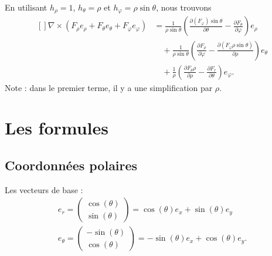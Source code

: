 En utilisant \( h_{\rho}=1\), \( h_{\theta}=\rho\) et \( h_{\varphi}=\rho\sin\theta\), nous trouvons
\begin{equation}
	\begin{aligned}[]
		\nabla\times(F_{\rho}e_{\rho}+F_{\theta}e_{\theta}+F_{\varphi}e_{\varphi}) & =\frac{1}{ \rho\sin\theta }\left( \frac{ \partial (F_{\varphi})\sin\theta }{ \partial \theta }-\frac{ \partial F_{\theta} }{ \partial \varphi } \right)e_{\rho}        \\
		                                                                           & \quad+\frac{1}{ \rho\sin\theta }\left( \frac{ \partial F_{\rho} }{ \partial \varphi }-\frac{ \partial (F_{\varphi}\rho\sin\theta) }{ \partial \rho } \right)e_{\theta} \\
		                                                                           & \quad+\frac{1}{ \rho }\left( \frac{ \partial F_{\theta}\rho }{ \partial \rho }-\frac{ \partial F_r }{ \partial \theta } \right)e_{\varphi}.
	\end{aligned}
\end{equation}
Note : dans le premier terme, il y a une simplification par \( \rho\).

\section{Les formules}

\subsection{Coordonnées polaires}

Les vecteurs de base :
\begin{subequations}
	\begin{align}
		e_r=\begin{pmatrix}
			    \cos(\theta) \\
			    \sin(\theta)
		    \end{pmatrix}=\cos(\theta)e_x+\sin(\theta)e_y \\
		e_{\theta}=\begin{pmatrix}
			           -\sin(\theta) \\
			           \cos(\theta)
		           \end{pmatrix}=-\sin(\theta)e_x+\cos(\theta)e_y.
	\end{align}
\end{subequations}

